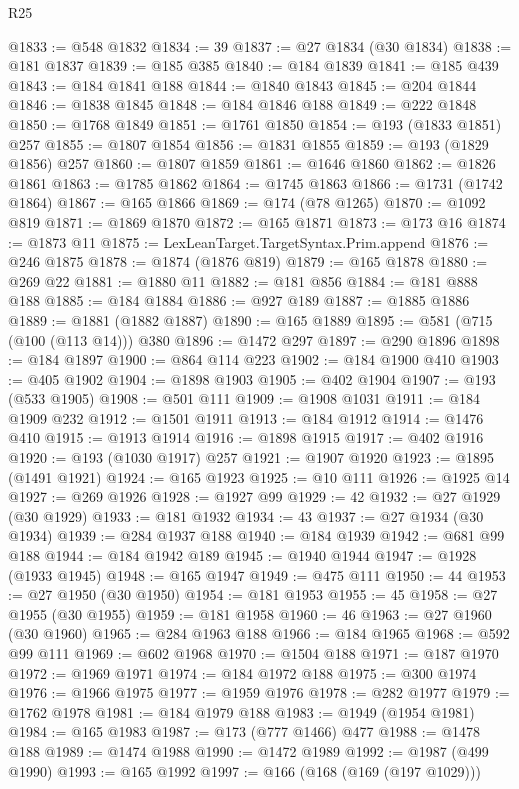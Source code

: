 \begin{lexlean}{R25}
\begin{coremodule}
@1833 := @548 @1832
@1834 := 39
@1837 := @27 @1834 (@30 @1834)
@1838 := @181 @1837
@1839 := @185 @385
@1840 := @184 @1839
@1841 := @185 @439
@1843 := @184 @1841 @188
@1844 := @1840 @1843
@1845 := @204 @1844
@1846 := @1838 @1845
@1848 := @184 @1846 @188
@1849 := @222 @1848
@1850 := @1768 @1849
@1851 := @1761 @1850
@1854 := @193 (@1833 @1851) @257
@1855 := @1807 @1854
@1856 := @1831 @1855
@1859 := @193 (@1829 @1856) @257
@1860 := @1807 @1859
@1861 := @1646 @1860
@1862 := @1826 @1861
@1863 := @1785 @1862
@1864 := @1745 @1863
@1866 := @1731 (@1742 @1864)
@1867 := @165 @1866
@1869 := @174 (@78 @1265)
@1870 := @1092 @819
@1871 := @1869 @1870
@1872 := @165 @1871
@1873 := @173 @16
@1874 := @1873 @11
@1875 := LexLeanTarget.TargetSyntax.Prim.append
@1876 := @246 @1875
@1878 := @1874 (@1876 @819)
@1879 := @165 @1878
@1880 := @269 @22
@1881 := @1880 @11
@1882 := @181 @856
@1884 := @181 @888 @188
@1885 := @184 @1884
@1886 := @927 @189
@1887 := @1885 @1886
@1889 := @1881 (@1882 @1887)
@1890 := @165 @1889
@1895 := @581 (@715 (@100 (@113 @14))) @380
@1896 := @1472 @297
@1897 := @290 @1896
@1898 := @184 @1897
@1900 := @864 @114 @223
@1902 := @184 @1900 @410
@1903 := @405 @1902
@1904 := @1898 @1903
@1905 := @402 @1904
@1907 := @193 (@533 @1905)
@1908 := @501 @111
@1909 := @1908 @1031
@1911 := @184 @1909 @232
@1912 := @1501 @1911
@1913 := @184 @1912
@1914 := @1476 @410
@1915 := @1913 @1914
@1916 := @1898 @1915
@1917 := @402 @1916
@1920 := @193 (@1030 @1917) @257
@1921 := @1907 @1920
@1923 := @1895 (@1491 @1921)
@1924 := @165 @1923
@1925 := @10 @111
@1926 := @1925 @14
@1927 := @269 @1926
@1928 := @1927 @99
@1929 := 42
@1932 := @27 @1929 (@30 @1929)
@1933 := @181 @1932
@1934 := 43
@1937 := @27 @1934 (@30 @1934)
@1939 := @284 @1937 @188
@1940 := @184 @1939
@1942 := @681 @99 @188
@1944 := @184 @1942 @189
@1945 := @1940 @1944
@1947 := @1928 (@1933 @1945)
@1948 := @165 @1947
@1949 := @475 @111
@1950 := 44
@1953 := @27 @1950 (@30 @1950)
@1954 := @181 @1953
@1955 := 45
@1958 := @27 @1955 (@30 @1955)
@1959 := @181 @1958
@1960 := 46
@1963 := @27 @1960 (@30 @1960)
@1965 := @284 @1963 @188
@1966 := @184 @1965
@1968 := @592 @99 @111
@1969 := @602 @1968
@1970 := @1504 @188
@1971 := @187 @1970
@1972 := @1969 @1971
@1974 := @184 @1972 @188
@1975 := @300 @1974
@1976 := @1966 @1975
@1977 := @1959 @1976
@1978 := @282 @1977
@1979 := @1762 @1978
@1981 := @184 @1979 @188
@1983 := @1949 (@1954 @1981)
@1984 := @165 @1983
@1987 := @173 (@777 @1466) @477
@1988 := @1478 @188
@1989 := @1474 @1988
@1990 := @1472 @1989
@1992 := @1987 (@499 @1990)
@1993 := @165 @1992
@1997 := @166 (@168 (@169 (@197 @1029)))

\end{coremodule}
\end{lexlean}
